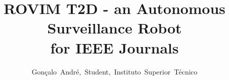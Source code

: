 \documentclass[journal]{IEEEtran}
\begin{document}



%
\title{ROVIM T2D - an Autonomous Surveillance Robot\\ for IEEE Journals}
%
%
%

\author{Gon\c{c}alo~Andr\'e,~Student,~Instituto~Superior~T\'ecnico}%

% 
%
\end{document}

